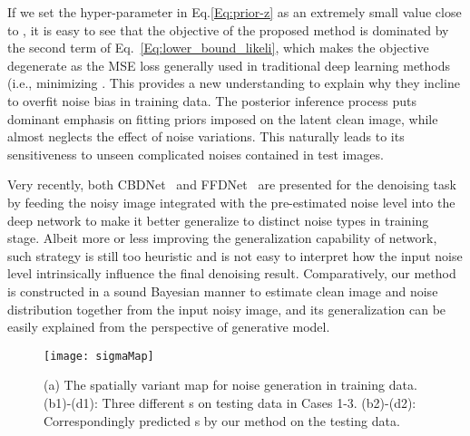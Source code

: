\documentclass{article}
\begin{document}
If we set the hyper-parameter  in Eq.\eqref{Eq:prior-z} as an extremely small value close to , it is
easy to see that the objective of the proposed method is dominated by the second term of Eq.~\eqref{Eq:lower_bound_likeli},
which makes the objective degenerate as the MSE loss generally used in traditional deep learning
methods (i.e., minimizing . This provides a new understanding to
explain why they incline to overfit noise bias in training data. The posterior inference process puts dominant
emphasis on fitting priors imposed on the latent clean image, while almost neglects the effect of noise variations. This
naturally leads to its sensitiveness to unseen complicated noises contained in test images.

Very recently, both CBDNet~\cite{guo2018toward} and FFDNet~\cite{zhang2018ffdnet} are presented for the
denoising task by feeding the noisy image integrated with the pre-estimated noise level into the deep network to
make it better generalize to distinct noise types in training stage. Albeit more or less improving
the generalization capability of network, such strategy is still too heuristic and is not easy to interpret
how the input noise level intrinsically influence the final denoising result. Comparatively, our method is
constructed in a sound Bayesian manner to estimate clean image and noise distribution together from the input
noisy image, and its generalization can be easily explained from the perspective of generative model.
\begin{figure}[t]
    \centering\vspace{-3mm}
    \texttt{[image: sigmaMap]}\vspace{-3mm}
    \caption{\small{(a) The spatially variant map  for noise generation in training data. (b1)-(d1):
        Three different s on testing data in Cases 1-3.
        (b2)-(d2): Correspondingly predicted s by our method on the testing data.}}
    \vspace{-2mm}
    \label{fig:sigma_train_test}
\end{figure}
\end{document}
